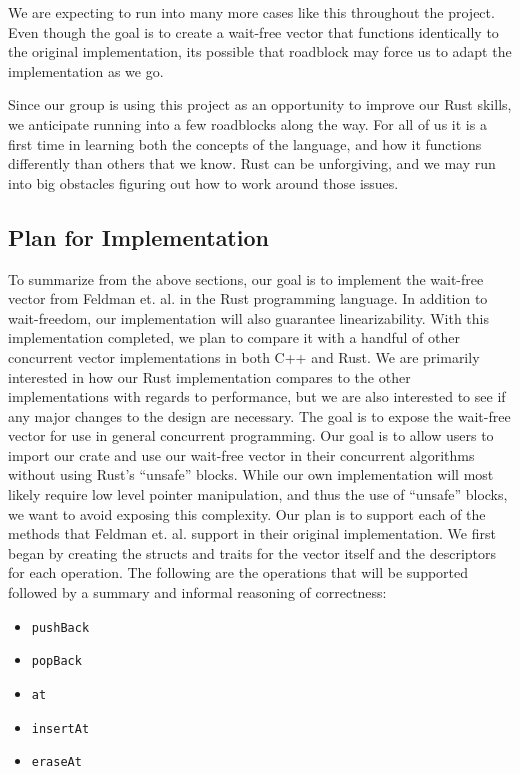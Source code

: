 \documentclass[conference]{IEEEtran}
\begin{document}
We are expecting to run into many more cases like this throughout the project. Even though the goal is to create a wait-free vector that functions identically to the original implementation, its possible that roadblock may force us to adapt the implementation as we go.



Since our group is using this project as an opportunity to improve our Rust skills, we anticipate running into a few roadblocks along the way. For all of us it is a first time in learning both the concepts of the language, and how it functions differently than others that we know. Rust can be unforgiving, and we may run into big obstacles figuring out how to work around those issues.



\subsection{Plan for Implementation}
To summarize from the above sections, our goal is to implement the wait-free vector from Feldman et. al. \cite{main} in the Rust programming language. In addition to wait-freedom, our implementation will also guarantee linearizability. With this implementation completed, we plan to compare it with a handful of other concurrent vector implementations in both C++ and Rust. We are primarily interested in how our Rust implementation compares to the other implementations with regards to performance, but we are also interested to see if any major changes to the design are necessary.
The goal is to expose the wait-free vector for use in general concurrent programming. Our goal is to allow users to import our crate and use our wait-free vector in their concurrent algorithms without using Rust’s “unsafe” blocks. While our own implementation will most likely require low level pointer manipulation, and thus the use of “unsafe” blocks, we want to avoid exposing this complexity.
Our plan is to support each of the methods that Feldman et. al. support in their original implementation. We first began by creating the structs and traits for the vector itself and the descriptors for each operation. The following are the operations that will be supported followed by a summary and informal reasoning of correctness:
    \begin{itemize}
        \item \verb|pushBack|
        \item \verb|popBack|
        \item \verb|at|
        \item \verb|insertAt|
        \item \verb|eraseAt|
    \end{itemize}
    
\end{document}

